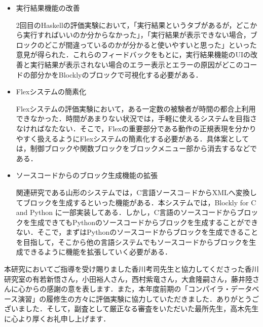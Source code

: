 \documentclass{risepaper}
\begin{document}
\begin{itemize}

\item 実行結果機能の改善

2回目のHaskellの評価実験において，「実行結果というタブがあるが，どこから実行すればいいのか分からなかった」，「実行結果が表示できない場合，ブロックのどこが間違っているのかが分かると使いやすいと思った」といった意見が得られた．これらのフィードバックをもとに，実行結果機能のUIの改善と実行結果が表示されない場合のエラー表示とエラーの原因がどこのコードの部分かをBlocklyのブロックで可視化する必要がある．

\item Flexシステムの簡素化

Flexシステムの評価実験において，ある一定数の被験者が時間の都合上利用できなかった．時間があまりない状況では，手軽に使えるシステムを目指さなければなたない．そこで，Flexの重要部分である動作の正規表現を分かりやすく扱えるようにFlexシステムの簡素化する必要がある．具体案としては，制御ブロックや関数ブロックをブロックメニュー部から消去するなどである．

\item ソースコードからのブロック生成機能の拡張

関連研究である山形のシステムでは，C言語ソースコ－ドからXMLへ変換してブロックを生成するといった機能がある．本システムでは，Blockly for C and Python に一部実装してある．しかし，C言語のソースコードからブロックを生成できてもPythonのソースコードからブロックを生成することができない．そこで，まずはPythonのソースコードからブロックを生成できることを目指して，そこから他の言語システムでもソースコードからブロックを生成できるように機能を拡張していく必要がある．

\end{itemize} 
 

\acknowledgment  %

本研究においてご指導を受け賜りました香川考司先生と協力してくださった香川研究室の有若新悟さん，小田裕人さん，西村紫竜さん，大倉隆嗣さん，藤井陸さんに心からの感謝の意を表します．また，本年度前期の「コンパイラ・データベース演習」の履修生の方々に評価実験に協力していただきました．ありがとうございました．そして，副査として厳正なる審査をいただいた最所先生，高木先生に心より厚くお礼申し上げます．
\end{document}
